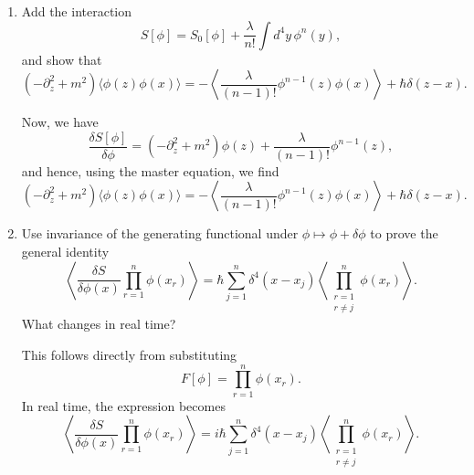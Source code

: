 \begin{enumerate}[label=\alph*)]
    \item Add the interaction
    \begin{equation}
        S[\phi]
        =S_0[\phi]+\frac{\lambda}{n!}\int d^4y\,\phi^n(y),
    \end{equation}
    and show that
    \begin{equation}
        (-\partial_z^2+m^2)
        \langle\phi(z)\phi(x)\rangle
        =-
        \left\langle
            \frac{\lambda}{(n-1)!}\phi^{n-1}(z)\phi(x)
        \right\rangle
        +\hbar\delta(z-x).
    \end{equation}
    \begin{solution}
        Now, we have
        \begin{equation}
            \frac{\delta S[\phi]}{\delta\phi} = (-\partial_z^2+m^2)\phi(z) + \frac{\lambda}{(n-1)!}\phi^{n-1}(z),
        \end{equation}
        and hence, using the master equation, we find
        \begin{equation}
                    (-\partial_z^2+m^2)
        \langle\phi(z)\phi(x)\rangle
        =-
        \left\langle
            \frac{\lambda}{(n-1)!}\phi^{n-1}(z)\phi(x)
        \right\rangle
        +\hbar\delta(z-x).
        \end{equation}
    \end{solution}
    \item Use invariance of the generating functional under
    $\phi\mapsto\phi+\delta\phi$ to prove the general identity
    \begin{equation}
        \left\langle
            \frac{\delta S}{\delta\phi(x)}
            \prod_{r=1}^{n}\phi(x_r)
        \right\rangle
        =\hbar\sum_{j=1}^{n}
        \delta^4(x-x_j)
        \left\langle
            \prod_{\substack{r=1\\r\neq j}}^{n}\phi(x_r)
        \right\rangle.
    \end{equation}
    What changes in real time?
    \begin{solution}
        This follows directly from substituting
        \begin{equation}
            F[\phi] = \prod_{r=1}^n\phi(x_r).
        \end{equation}
        In real time, the expression becomes
        \begin{equation}
             \left\langle
            \frac{\delta S}{\delta\phi(x)}
            \prod_{r=1}^{n}\phi(x_r)
        \right\rangle
        =i\hbar\sum_{j=1}^{n}
        \delta^4(x-x_j)
        \left\langle
            \prod_{\substack{r=1\\r\neq j}}^{n}\phi(x_r)
        \right\rangle.
        \end{equation}
    \end{solution}


\end{enumerate}
